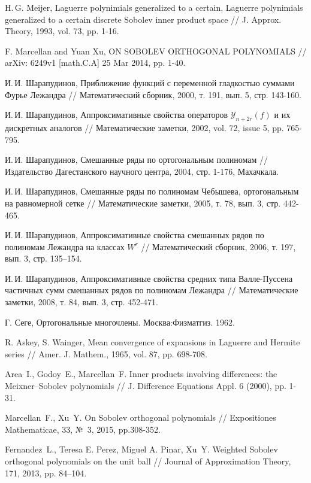  H.\,G. Meijer, Laguerre polynimials generalized to a certain,  Laguerre polynimials generalized to a certain discrete Sobolev inner product space // J. Approx. Theory, 1993, vol. 73, pp. 1-16.

 F. Marcellan and Yuan Xu, ON SOBOLEV ORTHOGONAL POLYNOMIALS //  arXiv: 6249v1 [math.C.A] 25 Mar 2014, pp. 1-40.

 И.\,И. Шарапудинов, Приближение функций с переменной гладкостью суммами Фурье Лежандра // Математический сборник, 2000, т. 191, вып. 5, стр. 143-160.

 И.\,И. Шарапудинов, Аппроксимативные свойства операторов $\mathcal{Y}_{n+2r}(f)$ и их дискретных аналогов // Математические заметки, 2002, vol. 72, issue 5, pp. 765-795.

 И.\,И. Шарапудинов, Смешанные ряды по ортогональным полиномам // Издательство Дагестанского научного центра, 2004, стр. 1-176, Махачкала.




 И.\,И. Шарапудинов, Смешанные ряды по полиномам Чебышева, ортогональным на равномерной сетке // Математические заметки, 2005, т. 78, вып. 3, стр. 442-465.

 И.\,И. Шарапудинов, Аппроксимативные свойства смешанных рядов по полиномам Лежандра на классах $W^r$ // Математический сборник, 2006, т. 197, вып. 3, стр. 135–154.


 И.\,И. Шарапудинов, Аппроксимативные свойства средних типа Валле-Пуссена частичных сумм смешанных рядов по полиномам Лежандра // Математические заметки, 2008, т. 84, вып. 3, стр. 452-471.

 Г. Сеге, Ортогональные многочлены. Москва:Физматгиз. 1962.

 R. Askey, S. Wainger, Mean convergence of expansions in Laguerre and Hermite series // Amer. J. Mathem., 1965, vol. 87, pp. 698-708. 


Area~I., Godoy~E., Marcellan~F. Inner products involving differences: the Meixner--Sobolev polynomials // J. Difference Equations Appl. 6 (2000), pp. 1-31.

Marcellan~F., Xu~Y. On Sobolev orthogonal polynomials // Expositiones Mathematicae, 33, №~3, 2015, pp.308-352.

Fernandez~L., Teresa E. Perez, Miguel A. Pinar, Xu~Y. Weighted Sobolev orthogonal polynomials on the unit ball // Journal of Approximation Theory, 171, 2013, pp. 84–104.

